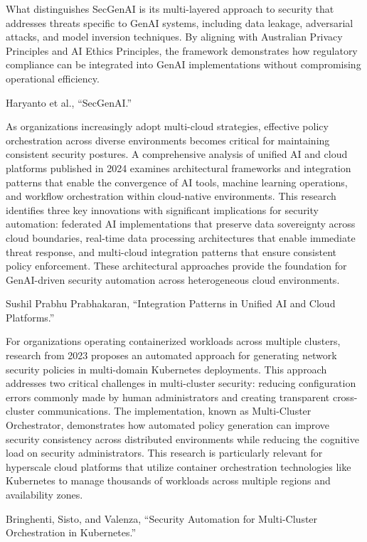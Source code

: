 What distinguishes SecGenAI is its multi-layered approach to security that addresses threats specific to GenAI systems, including data leakage, adversarial attacks, and model inversion techniques. By aligning with Australian Privacy Principles and AI Ethics Principles, the framework demonstrates how regulatory compliance can be integrated into GenAI implementations without compromising operational efficiency.

Haryanto et al., “SecGenAI.”

As organizations increasingly adopt multi-cloud strategies, effective policy orchestration across diverse environments becomes critical for maintaining consistent security postures. A comprehensive analysis of unified AI and cloud platforms published in 2024 examines architectural frameworks and integration patterns that enable the convergence of AI tools, machine learning operations, and workflow orchestration within cloud-native environments.
This research identifies three key innovations with significant implications for security automation: federated AI implementations that preserve data sovereignty across cloud boundaries, real-time data processing architectures that enable immediate threat response, and multi-cloud integration patterns that ensure consistent policy enforcement. These architectural approaches provide the foundation for GenAI-driven security automation across heterogeneous cloud environments.

Sushil Prabhu Prabhakaran, “Integration Patterns in Unified AI and Cloud Platforms.”

For organizations operating containerized workloads across multiple clusters, research from 2023 proposes an automated approach for generating network security policies in multi-domain Kubernetes deployments. This approach addresses two critical challenges in multi-cluster security: reducing configuration errors commonly made by human administrators and creating transparent cross-cluster communications.
The implementation, known as Multi-Cluster Orchestrator, demonstrates how automated policy generation can improve security consistency across distributed environments while reducing the cognitive load on security administrators. This research is particularly relevant for hyperscale cloud platforms that utilize container orchestration technologies like Kubernetes to manage thousands of workloads across multiple regions and availability zones.

Bringhenti, Sisto, and Valenza, “Security Automation for Multi-Cluster Orchestration in Kubernetes.”

